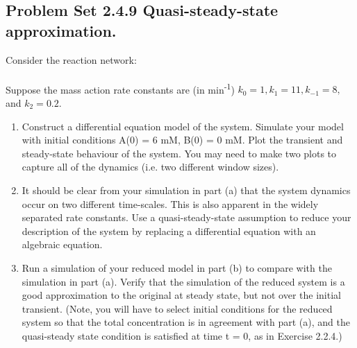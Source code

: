 \documentclass[paper=a4, fontsize=11pt]{scrartcl} %
\numberwithin{equation}{section} %
\numberwithin{figure}{section} %
\numberwithin{table}{section} %
\begin{document}
\subsection{Problem Set 2.4.9 Quasi-steady-state approximation.}
	Consider the reaction network:\\
	\\
	Suppose the mass action rate constants are (in min\textsuperscript{-1}) $k_{0}=1, k_{1} = 11, k_{-1} = 8,$ and $k_{2} = 0.2$.
	\begin{enumerate}
		\item Construct a differential equation model of the system. Simulate your model with initial conditions A(0) = 6 mM, B(0) = 0 mM. Plot the transient and steady-state behaviour of the system. You may need to make two plots to capture all of the dynamics (i.e. two different window sizes).


		\item It should be clear from your simulation in part (a) that the system dynamics occur on two different time-scales. This is also apparent in the widely separated rate constants. Use a quasi-steady-state assumption to reduce your description of the system by replacing a differential equation with an algebraic equation.
		\item Run a simulation of your reduced model in part (b) to compare with the simulation in part (a). Verify that the simulation of the reduced system is a good approximation to the original at steady state, but not over the initial transient. (Note, you will have to select initial conditions for the reduced system so that the total concentration is in agreement with part (a), and the quasi-steady state condition is satisfied at time t = 0, as in Exercise 2.2.4.)
	\end{enumerate}
\end{document}
